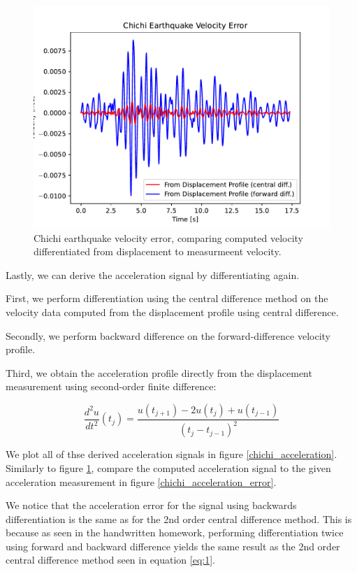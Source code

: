\begin{figure}
    \centering
    \includegraphics*[width=0.75\columnwidth]{chichi_velocity_error.pdf}
    \caption{Chichi earthquake velocity error, comparing computed velocity differentiated from 
             displacement to measurmeent velocity.}
    \label{chichi_velocity_error}
\end{figure}

\clearpage
Lastly, we can derive the acceleration signal by differentiating again. 

First, we perform differentiation using the central difference method on the velocity data 
computed from the displacement profile using central difference.

Secondly, we perform backward difference on the forward-difference velocity profile.

Third, we obtain the acceleration profile directly from the displacement measurement using second-order 
finite difference:

\begin{equation}
    \frac{d^2 u}{d t^2}\left(t_j\right)=\frac{u\left(t_{j+1}\right)-2 u\left(t_j\right)+u\left(t_{j-1}\right)}{\left(t_j-t_{j-1}\right)^2}
    \label{eq:1}
\end{equation}

We plot all of thse derived acceleration signals in figure \ref{chichi_acceleration}. 
Similarly to figure \ref{chichi_velocity_error}, compare the computed acceleration signal to the given 
acceleration measurement in figure \ref{chichi_acceleration_error}.

We notice that the acceleration error for the signal using backwards differentiation is the same as for the 2nd 
order central difference method. This is because as seen in the handwritten homework, performing differentiation twice 
using forward and backward difference yields the same result as the 2nd order central difference method seen in equation \ref{eq:1}.


